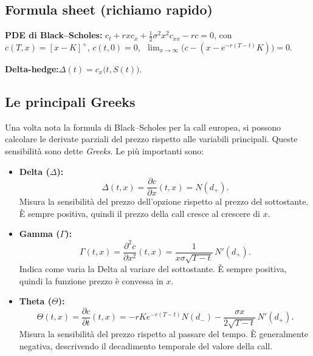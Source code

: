 \documentclass[12pt,a4paper]{book}
\theoremstyle{remark}
\begin{document}
\subsection*{Formula sheet (richiamo rapido)}
\noindent\textbf{PDE di Black--Scholes:}\quad
$c_t + r x c_x + \tfrac12 \sigma^2 x^2 c_{xx} - r c = 0$,
con
$c(T,x)=[x-K]^+$,
$c(t,0)=0$,
$\;\lim_{x\to\infty}\!\big(c-(x-e^{-r(T-t)}K)\big)=0$.

\medskip
\noindent\textbf{Delta-hedge:}\quad $\Delta(t)=c_x\big(t,S(t)\big)$.

\subsection{Le principali Greeks}

Una volta nota la formula di Black--Scholes per la call europea, si possono calcolare le derivate parziali del prezzo rispetto alle variabili principali. Queste sensibilità sono dette \emph{Greeks}. Le più importanti sono:

\begin{itemize}
  \item \textbf{Delta ($\Delta$):}
  \[
  \Delta(t,x) = \frac{\partial c}{\partial x}(t,x) = N(d_+).
  \]
  Misura la sensibilità del prezzo dell’opzione rispetto al prezzo del sottostante. È sempre positiva, quindi il prezzo della call cresce al crescere di $x$.

  \item \textbf{Gamma ($\Gamma$):}
  \[
  \Gamma(t,x) = \frac{\partial^2 c}{\partial x^2}(t,x)
  = \frac{1}{x\sigma\sqrt{T-t}}\,N'(d_+).
  \]
  Indica come varia la Delta al variare del sottostante. È sempre positiva, quindi la funzione prezzo è convessa in $x$.

  \item \textbf{Theta ($\Theta$):}
  \[
  \Theta(t,x) = \frac{\partial c}{\partial t}(t,x)
  = -rK e^{-r(T-t)}N(d_-) - \frac{\sigma x}{2\sqrt{T-t}}\,N'(d_+).
  \]
  Misura la sensibilità del prezzo rispetto al passare del tempo. È generalmente negativa, descrivendo il decadimento temporale del valore della call.
\end{itemize}
\end{document}
